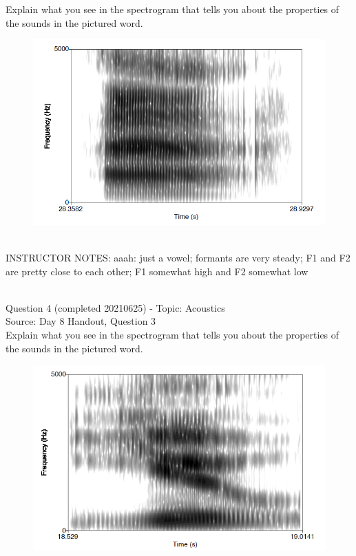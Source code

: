 \documentclass[12pt]{article}
\begin{document}
Explain what you see in the spectrogram that tells you about the properties of the sounds in the pictured word.\\

\begin{figure}[H]
\includegraphics{../images/spectrogram_aaah.png}
\end{figure}

~\\
INSTRUCTOR NOTES: aaah: just a vowel; formants are very steady; F1 and F2 are pretty close to each other; F1 somewhat high and F2 somewhat low


~\\

{\large Question 4} (completed 20210625) - Topic: Acoustics\\
Source: Day 8 Handout, Question 3\\

Explain what you see in the spectrogram that tells you about the properties of the sounds in the pictured word.\\

\begin{figure}[H]
\includegraphics{../images/spectrogram_you.png}
\end{figure}
\end{document}
